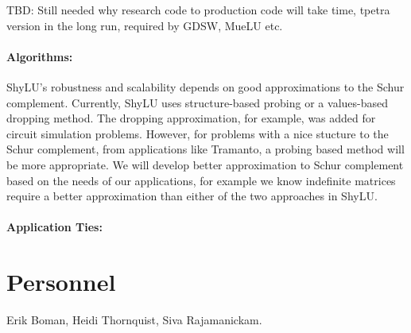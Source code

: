 \documentclass[10pt]{amsart}
\begin{document}
TBD: Still needed why research code to production code will take time, tpetra
version in the long run, required by GDSW, MueLU etc.

\paragraph{\bf{Algorithms}:} ShyLU's robustness and scalability depends on good
approximations to the Schur complement. Currently, ShyLU uses 
structure-based probing
or a values-based dropping method. The dropping approximation, for
example, was added for circuit simulation problems. However, for problems
with a nice stucture to the Schur complement, from applications like Tramanto,
a probing based method will be more appropriate. We will develop better
approximation to Schur complement based on the needs of our applications, for
example we know indefinite matrices require a better approximation than either
of the two approaches in ShyLU.

\paragraph{\bf{Application Ties}:}


\section{Personnel}
Erik Boman, Heidi Thornquist, Siva Rajamanickam.
\end{document}
